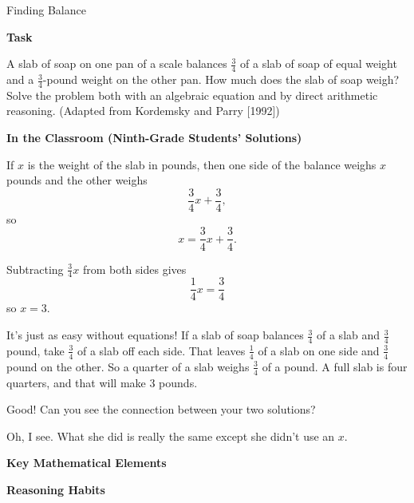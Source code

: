 \TriExample
  {Finding Balance}
  {
    \textbf{Task}

    A slab of soap on one pan of a scale balances $\frac{3}{4}$ of a slab of soap of equal weight and a $\frac{3}{4}$-pound weight on the other pan. How much does the slab of soap weigh? Solve the problem both with an algebraic equation and by direct arithmetic reasoning.  (Adapted from Kordemsky and Parry [1992])

    \textbf{In the Classroom (Ninth-Grade Students' Solutions)}

    \begin{scriptlist}
      \item [Student 1:] If $x$ is the weight of the slab in pounds, then one side of the balance weighs $x$ pounds and the other weighs
      $$
      \frac{3}{4}x+\frac{3}{4},
      $$
      so
      $$
      x=\frac{3}{4}x+\frac{3}{4}.
      $$

      Subtracting $\frac{3}{4}x$ from both sides gives
      $$
      \frac{1}{4}x=\frac{3}{4}
      $$
      so $x=3$.\vspace{.5\baselineskip}

      \item [Student 2:] It's just as easy without equations! If a slab of soap balances $\frac{3}{4}$ of a slab and $\frac{3}{4}$ pound, take $\frac{3}{4}$ of a slab off each side. That leaves $\frac{1}{4}$ of a slab on one side and $\frac{3}{4}$ pound on the other. So a quarter of a slab weighs $\frac{3}{4}$ of a pound. A full slab is four quarters, and that will make $3$ pounds.\vspace{2\baselineskip}

      \item [Teacher:] Good! Can you see the connection between your two solutions?

      \item [Student 1:] Oh, I see. What she did is really the same except she didn't use an $x$.
    \end{scriptlist}

    \textbf{Key Mathematical Elements}

    \begin{hanglist}
    \end{hanglist}

    \textbf{Reasoning Habits}

    \begin{hanglist}

    \end{hanglist}
  }
